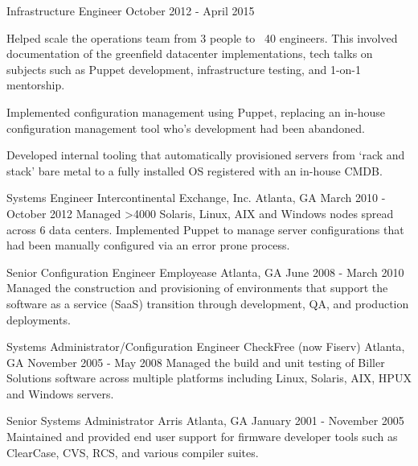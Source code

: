 \begin{cventries}
  \cventry
    {Infrastructure Engineer} %
    {} %
    {} %
    {October 2012 - April 2015} %
    {
      \begin{cvitems} %
        \item {Helped scale the operations team from 3 people to ~40 engineers. This involved documentation of the greenfield datacenter implementations, tech talks on subjects such as Puppet development, infrastructure testing, and 1-on-1 mentorship.}
        \item {Implemented configuration management using Puppet, replacing an in-house configuration management tool who's development had been abandoned.}
        \item {Developed internal tooling that automatically provisioned servers from `rack and stack' bare metal to a fully installed OS registered with an in-house CMDB.}
      \end{cvitems}
    }

  \cventry
    {Systems Engineer} %
    {Intercontinental Exchange, Inc.} %
    {Atlanta, GA} %
    {March 2010 - October 2012} %
    {Managed >4000 Solaris, Linux, AIX and Windows nodes spread across 6 data centers. Implemented Puppet to manage server configurations that had been manually configured via an error prone process.}

  \cventry
    {Senior Configuration Engineer} %
    {Employease} %
    {Atlanta, GA} %
    {June 2008 - March 2010} %
    {Managed the construction and provisioning of environments that support the software as a service (SaaS) transition through development, QA, and production deployments.}

  \cventry
    {Systems Administrator/Configuration Engineer} %
    {CheckFree (now Fiserv)} %
    {Atlanta, GA} %
    {November 2005 - May 2008} %
    {Managed the build and unit testing of Biller Solutions software across multiple platforms including Linux, Solaris, AIX, HPUX and Windows servers.}

  \cventry
    {Senior Systems Administrator} %
    {Arris} %
    {Atlanta, GA} %
    {January 2001 - November 2005} %
    {Maintained and provided end user support for firmware developer tools such as ClearCase, CVS, RCS, and various compiler suites.}


\end{cventries}
